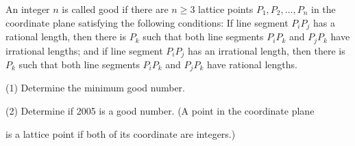 An integer $ n$ is called good if there are $ n \geq 3$ lattice points $ P_1, P_2, \ldots, P_n$ in the coordinate plane satisfying the following conditions: If line segment $ P_iP_j$ has a rational length, then there is $ P_k$ such that both line segments $ P_iP_k$ and $ P_jP_k$ have irrational lengths; and if line segment $ P_iP_j$ has an irrational length, then there is $ P_k$ such that both line segments $ P_iP_k$ and $ P_jP_k$ have rational lengths.

(1) Determine the minimum good number.

(2) Determine if 2005 is a good number. (A point in the coordinate plane

 is a lattice point if both of its coordinate are integers.)
